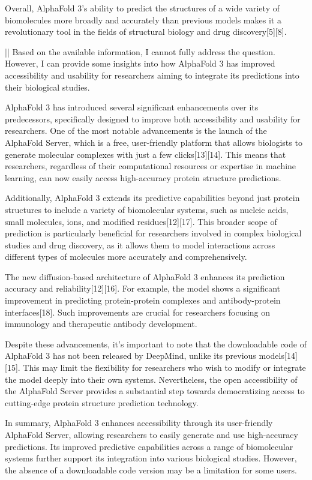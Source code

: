 \documentclass[11pt]{article}
\begin{document}
\begin{showcase}[title=Topic: AlphaFold 3]
Overall, AlphaFold 3's ability to predict the structures of a wide variety of biomolecules more broadly and accurately than previous models makes it a revolutionary tool in the fields of structural biology and drug discovery[5][8].

||
Based on the available information, I cannot fully address the question. However, I can provide some insights into how AlphaFold 3 has improved accessibility and usability for researchers aiming to integrate its predictions into their biological studies.

AlphaFold 3 has introduced several significant enhancements over its predecessors, specifically designed to improve both accessibility and usability for researchers. One of the most notable advancements is the launch of the AlphaFold Server, which is a free, user-friendly platform that allows biologists to generate molecular complexes with just a few clicks[13][14]. This means that researchers, regardless of their computational resources or expertise in machine learning, can now easily access high-accuracy protein structure predictions. 

Additionally, AlphaFold 3 extends its predictive capabilities beyond just protein structures to include a variety of biomolecular systems, such as nucleic acids, small molecules, ions, and modified residues[12][17]. This broader scope of prediction is particularly beneficial for researchers involved in complex biological studies and drug discovery, as it allows them to model interactions across different types of molecules more accurately and comprehensively.

The new diffusion-based architecture of AlphaFold 3 enhances its prediction accuracy and reliability[12][16]. For example, the model shows a significant improvement in predicting protein-protein complexes and antibody-protein interfaces[18]. Such improvements are crucial for researchers focusing on immunology and therapeutic antibody development.

Despite these advancements, it's important to note that the downloadable code of AlphaFold 3 has not been released by DeepMind, unlike its previous models[14][15]. This may limit the flexibility for researchers who wish to modify or integrate the model deeply into their own systems. Nevertheless, the open accessibility of the AlphaFold Server provides a substantial step towards democratizing access to cutting-edge protein structure prediction technology.

In summary, AlphaFold 3 enhances accessibility through its user-friendly AlphaFold Server, allowing researchers to easily generate and use high-accuracy predictions. Its improved predictive capabilities across a range of biomolecular systems further support its integration into various biological studies. However, the absence of a downloadable code version may be a limitation for some users.


\end{showcase}
\end{document}
